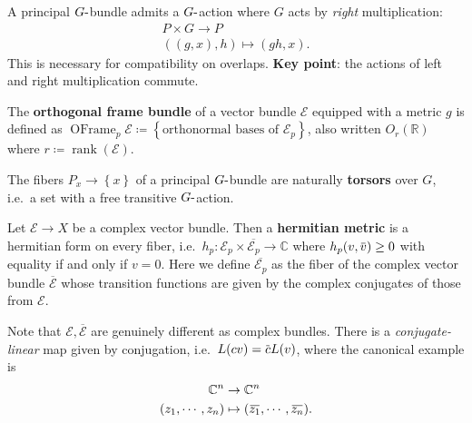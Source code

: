\begin{remark}[Important]

A principal \(G{\hbox{-}}\)bundle admits a \(G{\hbox{-}}\)action where
\(G\) acts by \emph{right} multiplication:
\begin{align*}
P \times G \to P \\
( (g, x), h) \mapsto (gh, x)
.\end{align*}
This is necessary for compatibility on overlaps. \textbf{Key point}: the
actions of left and right multiplication commute.

\end{remark}

\begin{definition}

The \textbf{orthogonal frame bundle} of a vector bundle \(\mathcal{E}\)
equipped with a metric \(g\) is defined as
\({\operatorname{OFrame}}_p \mathcal{E}\coloneqq\left\{{\text{orthonormal bases of } \mathcal{E}_p}\right\}\),
also written \(O_r({\mathbb{R}})\) where
\(r \coloneqq\operatorname{rank}( \mathcal{E})\).

\end{definition}

\begin{remark}

The fibers \(P_x \to \left\{{x}\right\}\) of a principal
\(G{\hbox{-}}\)bundle are naturally \textbf{torsors} over \(G\), i.e.~a
set with a free transitive \(G{\hbox{-}}\)action.

\end{remark}

\begin{definition}[?]

Let \(\mathcal{E}\to X\) be a complex vector bundle. Then a
\textbf{hermitian metric} is a hermitian form on every fiber,
i.e.~\(h_p: \mathcal{E}_p \times\overline{\mathcal{E}_p } \to {\mathbb{C}}\)
where
\(h_p(v, \mkern 1.5mu\overline{\mkern-1.5muv\mkern-1.5mu}\mkern 1.5mu ) \geq 0\)
with equality if and only if \(v=0\). Here we define
\(\overline{\mathcal{E}_p}\) as the fiber of the complex vector bundle
\(\overline{\mathcal{E}}\) whose transition functions are given by the
complex conjugates of those from \(\mathcal{E}\).

\end{definition}

\begin{remark}

Note that \(\mathcal{E}, \overline{\mathcal{E}}\) are genuinely
different as complex bundles. There is a \emph{conjugate-linear} map
given by conjugation,
i.e.~\(L(cv) = \mkern 1.5mu\overline{\mkern-1.5muc\mkern-1.5mu}\mkern 1.5mu L(v)\),
where the canonical example is
\begin{align*}
{\mathbb{C}}^n &\to {\mathbb{C}}^n \\
(z_1, \cdots, z_n) &\mapsto (\mkern 1.5mu\overline{\mkern-1.5muz_1\mkern-1.5mu}\mkern 1.5mu, \cdots, \mkern 1.5mu\overline{\mkern-1.5muz_n\mkern-1.5mu}\mkern 1.5mu)
.\end{align*}

\end{remark}

